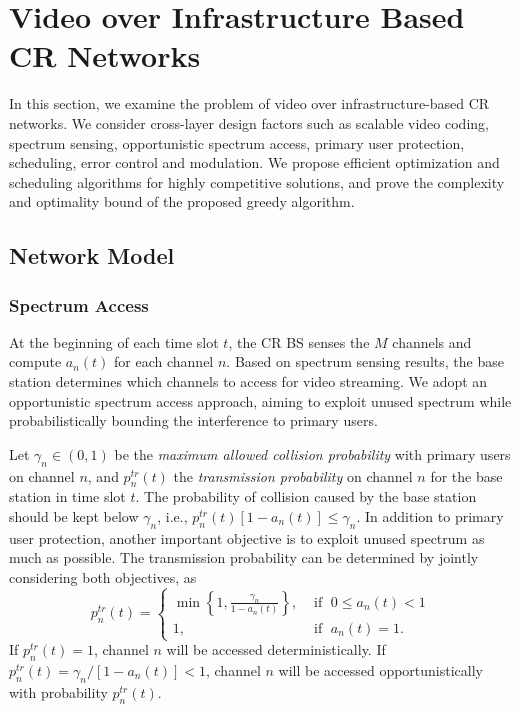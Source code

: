 \documentclass[12pt,onecolumn,draftclsnofoot]{IEEEtran} %
\begin{document}
\section{Video over Infrastructure Based CR Networks}\label{sec:cr_video_mcast}
%
In this section, we examine the problem of video over infrastructure-based CR networks. We consider cross-layer design factors such as scalable video coding, spectrum sensing, opportunistic spectrum access, primary user protection, scheduling, error control and modulation. We propose efficient optimization and scheduling algorithms for highly competitive solutions, and prove the complexity and optimality bound of the proposed greedy algorithm.

\subsection{Network Model}

\subsubsection{Spectrum Access \label{subsec:osa}}

At the beginning of each time slot $t$, the CR BS senses the $M$ channels and compute $a_n(t)$ for each channel $n$. Based on spectrum sensing results, the base station determines which channels to access for video streaming. We adopt an opportunistic spectrum access approach, aiming to exploit unused spectrum while probabilistically bounding the interference to primary users.  

Let $\gamma_n \in (0, 1)$ be the {\em maximum allowed collision probability} with primary users on channel $n$, and $p^{tr}_n(t)$ the {\em transmission probability} on channel $n$ for the base station in time slot $t$.  The probability of collision caused by the base station should be kept below $\gamma_n$, i.e., $p^{tr}_n(t) \left[ 1 - a_n(t) \right] \le \gamma_n$.  In addition to primary user protection, another important objective is to exploit unused spectrum as much as possible.  The transmission probability can be determined by jointly considering both objectives, as
\begin{equation}\label{eq:ptran}
  p^{tr}_n(t) = \left\{ \begin{array} {ll}
         \min \left\{ 1, \frac{\gamma_n}{1-a_n(t)} \right\}, & \mbox{ if }\; 0 \leq a_n(t) < 1 \\
         1, & \mbox{ if }\; a_n(t) =1. 
                        \end{array} \right.                        
\end{equation}
If $p^{tr}_n(t)=1$, channel $n$ will be accessed deterministically. If $p^{tr}_n(t) = \gamma_n / [1-a_n(t)] <1$, channel $n$ will be accessed opportunistically with probability $p^{tr}_n(t)$.
\end{document}
